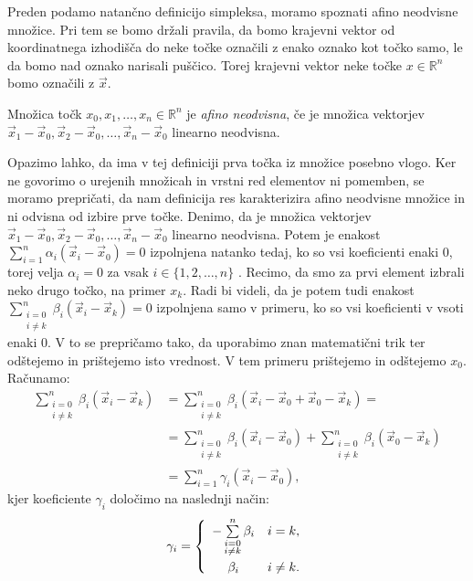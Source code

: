 \documentclass[mat1]{fmfdelo}
\newcommand{\R}{\mathbb R}
\newcommand{\0}{\underline{0}}
\begin{document}
Preden podamo natančno definicijo simpleksa, moramo spoznati afino neodvisne množice. Pri tem se bomo držali pravila, da bomo krajevni vektor od koordinatnega izhodišča do neke točke označili z enako oznako kot točko samo, le da bomo nad oznako narisali puščico. Torej krajevni vektor neke točke $x \in \R^n$ bomo označili z $\vec{x}$.
\begin{definicija}
Množica točk $x_0, x_1, \dots , x_n \in \R^n$ je \emph{afino neodvisna}, če je množica vektorjev $\vec{x}_1 - \vec{x}_0, \vec{x}_2 - \vec{x}_0, \dots , \vec{x}_n - \vec{x}_0$ linearno neodvisna.
\end{definicija}

Opazimo lahko, da ima v tej definiciji prva točka iz množice posebno vlogo. Ker ne govorimo o urejenih množicah in vrstni red elementov ni pomemben, se moramo prepričati, da nam definicija res karakterizira afino neodvisne množice in ni odvisna od izbire prve točke. Denimo, da je množica vektorjev $\vec{x}_1 - \vec{x}_0, \vec{x}_2 - \vec{x}_0, \dots , \vec{x}_n - \vec{x}_0$ linearno neodvisna. Potem je enakost $\sum\limits_{i=1}^n \alpha_i (\vec{x}_i - \vec{x}_0) = 0$ izpolnjena natanko tedaj, ko so vsi koeficienti enaki $0$, torej velja $\alpha_i = 0$ za vsak $i \in \{ 1, 2, \dots, n \}$ . Recimo, da smo za prvi element izbrali neko drugo točko, na primer $x_k$. Radi bi videli, da je potem tudi enakost $\sum\limits_{\substack{i=0 \\ i\neq k}}^n \beta_i (\vec{x}_i - \vec{x}_k) = 0$ izpolnjena samo v primeru, ko so vsi koeficienti v vsoti enaki $0$. V to se prepričamo tako, da uporabimo znan matematični trik ter odštejemo in prištejemo isto vrednost. V tem primeru prištejemo in odštejemo $x_0$.
Računamo:
\begin{align*} 
\sum\limits_{\substack{i=0 \\ i \neq k}}^n \beta_i (\vec{x}_i - \vec{x}_k) &=  \sum\limits_{\substack{i=0 \\ i \neq k}}^n \beta_i (\vec{x}_i - \vec{x}_0 + \vec{x}_0 - \vec{x}_k) = \\
&=\sum\limits_{\substack{i=0 \\ i\neq k}}^n \beta_i (\vec{x}_i - \vec{x}_0) + \sum\limits_{\substack{i=0 \\ i\neq k}}^n \beta_i (\vec{x}_0 - \vec{x}_k) \\
&= \sum\limits_{i=1}^n \gamma_i (\vec{x}_i - \vec{x}_0),
\end{align*}
kjer koeficiente $\gamma_i$ določimo na naslednji način:
\[  \gamma_i =  \left\{
\begin{array}{cl}\vspace{3pt}
	-\sum\limits_{\substack{i=0 \\ i\neq k}}^n \beta_i & i = k,\\
	\beta_i & i \neq k. \\
\end{array} 
\right. \]
\end{document}
